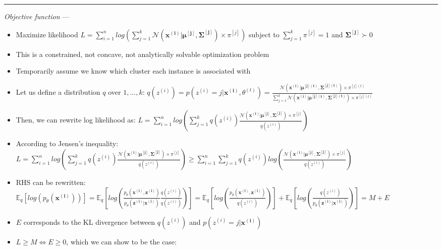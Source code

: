 {\color{lightgray}\hrule height 0.001mm}

\emph{Objective function} --- 
\begin{itemize}
    \item Maximize likelihood $L = \sum_{i=1}^n log( \sum_{j=1}^k \mathcal{N}(\boldsymbol{x^{(i)}} | \boldsymbol{\mu^{[j]}}, \boldsymbol{\Sigma^{[j]}}) \times \pi^{[j]} ) $ subject to $\sum_{j=1}^k \pi^{[j]} = 1$ and $\boldsymbol{\Sigma^{[j]}} \succ 0$
    \item This is a constrained, not concave, not analytically solvable optimization problem
    \item Temporarily assume we know which cluster each instance is associated with
    \item Let us define a distribution $q$ over ${1,...,k}$: $q(z^{(i)}) = p( z^{(i)} = j | \boldsymbol{x^{(i)}}, \theta^{(t)} ) = \frac{ \mathcal{N}(\boldsymbol{x^{(i)}} | \boldsymbol{\mu^{[j](t)}}, \boldsymbol{\Sigma^{[j](t)}}) \times \pi^{[j](t)} }{\sum_{j=1}^k \mathcal{N}(\boldsymbol{x^{(i)}} | \boldsymbol{\mu^{[j](t)}}, \boldsymbol{\Sigma^{[j](t)}}) \times \pi^{[j](t)} }$
    \item Then, we can rewrite log likelihood as: $L = \sum_{i=1}^n log( \sum_{j=1}^k q(z^{(i)}) \frac{ \mathcal{N}(\boldsymbol{x^{(i)}} | \boldsymbol{\mu^{[j]}}, \boldsymbol{\Sigma^{[j]}}) \times \pi^{[j]} }{ q(z^{(i)}) } )$
    \item According to Jensen's inequality: $L = \sum_{i=1}^n log( \sum_{j=1}^k q(z^{(i)}) \frac{ \mathcal{N}(\boldsymbol{x^{(i)}} | \boldsymbol{\mu^{[j]}}, \boldsymbol{\Sigma^{[j]}}) \times \pi^{[j]} }{ q(z^{(i)}) } ) \geq \sum_{i=1}^n \sum_{j=1}^k q(z^{(i)}) log( \frac{ \mathcal{N}(\boldsymbol{x^{(i)}} | \boldsymbol{\mu^{[j]}}, \boldsymbol{\Sigma^{[j]}}) \times \pi^{[j]} }{ q(z^{(i)}) } )$
    \item RHS can be rewritten: $\mathbb{E}_q[log(p_{\theta}(\boldsymbol{x^{(i)}}))] = \mathbb{E}_q[log(\frac{ p_{\theta}(\boldsymbol{x^{(i)}}, \boldsymbol{z^{(i)}}) }{ p_{\theta}(\boldsymbol{z^{(i)}} | \boldsymbol{x^{(i)}}) } \frac{ q(z^{(i)}) }{ q(z^{(i)}) } )] = \mathbb{E}_q[ log( \frac{ p_{\theta}(\boldsymbol{x^{(i)}}, \boldsymbol{z^{(i)}}) } { q(z^{(i)}) } ) ] + \mathbb{E}_q[ log(\frac{ q(z^{(i)}) }{ p_{\theta}(\boldsymbol{z^{(i)}} | \boldsymbol{x^{(i)}}) }) ] = M + E$
    \item $E$ corresponds to the KL divergence between $q(z^{(i)})$ and $p( z^{(i)} = j | \boldsymbol{x^{(i)}} )$
    \item $L \geq M \Leftrightarrow E \geq 0$, which we can show to be the case: 

\end{itemize}
